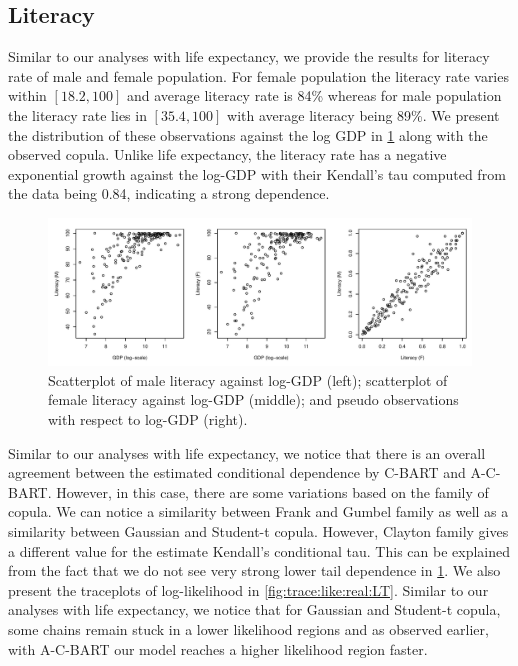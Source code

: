 \documentclass{amsart}
\begin{document}
\subsection{Literacy}
Similar to our analyses with life expectancy, we provide the results for literacy rate of male and female population. For female population the literacy rate varies within $[18.2,100]$ and average literacy rate is 84\% whereas for male population the literacy rate lies in $[35.4,100]$ with average literacy being 89\%. We present the distribution of these observations against the log GDP in \cref{fig:data:dist:LT} along with the observed copula. Unlike life expectancy, the literacy rate has a negative exponential growth against the log-GDP with their Kendall's tau computed from the data being 0.84, indicating a strong dependence. 
\begin{figure}
	\centering
	\includegraphics[width = 0.95\linewidth]{"cia_LT_plots.pdf"}
	\caption{Scatterplot of male literacy against log-GDP (left); scatterplot of female literacy against log-GDP (middle); and pseudo observations with respect to log-GDP (right).}
	\label{fig:data:dist:LT}
\end{figure}

Similar to our analyses with life expectancy, we notice that there is an overall agreement between the estimated conditional dependence by C-BART and A-C-BART. However, in this case, there are some variations based on the family of copula. We can notice a similarity between Frank and Gumbel family as well as a similarity between Gaussian and Student-t copula. However, Clayton family gives a different value for the estimate Kendall's conditional tau. This can be explained from the fact that we do not see very strong lower tail dependence in \cref{fig:data:dist:LT}. We also present the traceplots of log-likelihood in \cref{fig:trace:like:real:LT}. Similar to our analyses with life expectancy, we notice that for Gaussian and Student-t copula, some chains remain stuck in a lower likelihood regions and as observed earlier, with A-C-BART our model reaches a higher likelihood region faster.
\end{document}
